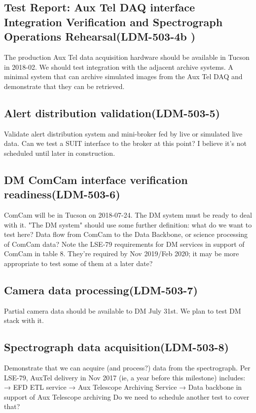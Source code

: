 \subsection{Test Report: Aux Tel DAQ interface Integration Verification and Spectrograph Operations Rehearsal\textbf{(LDM-503-4b )}\label{LDM-503-4b }}
 The production Aux Tel data acquisition hardware should be available in Tucson in 2018-02. We should test integration with the adjacent archive systems.
 \newline A minimal system that can archive simulated images from the Aux Tel DAQ and demonstrate that they can be retrieved.
\subsection{ Alert distribution validation\textbf{(LDM-503-5)}\label{LDM-503-5}}
 Validate alert distribution system and mini-broker fed by live or simulated live data.
 \newline Can we test a SUIT interface to the broker at this point? I believe it's not scheduled until later in construction.
\subsection{ DM ComCam interface verification readiness\textbf{(LDM-503-6)}\label{LDM-503-6}}
 ComCam will be in Tucson on 2018-07-24. The DM system must be ready to deal with it.
 \newline "The DM system" should use some further definition: what do we want to test here? Data flow from ComCam to the Data Backbone, or science processing of ComCam data?
 Note the LSE-79 requirements for DM services in support of ComCam in table 8. They're required by Nov 2019/Feb 2020; it may be more appropriate to test some of them at a later date?
\subsection{ Camera data processing\textbf{(LDM-503-7)}\label{LDM-503-7}}
 Partial camera data should be available to DM July 31st. We plan to test DM stack with it.
 \newline
\subsection{ Spectrograph data acquisition\textbf{(LDM-503-8)}\label{LDM-503-8}}
 Demonstrate that we can acquire (and process?) data from the spectrograph.
 \newline Per LSE-79, AuxTel delivery in Nov 2017 (ie, a year before this milestone) includes: → EFD ETL service → Aux Telescope Archiving Service → Data backbone in support of Aux Telescope archiving Do we need to schedule another test to cover that?
